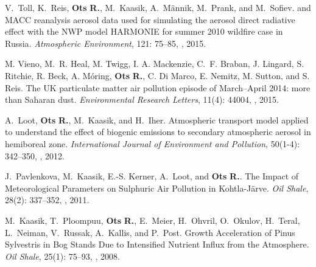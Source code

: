 \documentclass[paper=a4,fontsize=11pt]{scrartcl} %
\begin{document}
\begin{thebibliography}{3}
V.~Toll, K.~Reis, \textbf{Ots} \textbf{R.},  M.~Kaasik, A.~Männik, M.~Prank,
and M.~Sofiev.
 and {MACC} reanalysis aerosol data used for simulating the
aerosol direct radiative effect with the {NWP} model {HARMONIE} for summer
2010 wildfire case in {Russia}.
\newblock \emph{Atmospheric Environment}, 121: 75--85,
\newblock {},  2015.



M. Vieno, M.~R. Heal, M. Twigg, I. A. Mackenzie, C.~F. Braban, J. Lingard, S. Ritchie, R. Beck, A. Móring, \textbf{Ots} \textbf{R.},  C. Di Marco, E. Nemitz, M. Sutton, and S. Reis.
\newblock The UK particulate matter air pollution episode of March–April 2014: more than Saharan dust.
\newblock \emph{Environmental Research Letters}, 11(4): 44004, , 2015.

A.~Loot, \textbf{Ots} \textbf{R.},  M.~Kaasik, and H.~Iher.
\newblock Atmospheric transport model applied to understand the effect of
biogenic emissions to secondary atmospheric aerosol in hemiboreal zone.
\newblock \emph{International Journal of Environment and Pollution},
50(1-4): 342--350, 
\newblock {}, 2012.

J.~Pavlenkova, M.~Kaasik, E.-S. Kerner, A.~Loot, and \textbf{Ots} \textbf{R.}.
\newblock The {Impact} of {Meteorological} {Parameters} on {Sulphuric} {Air}
  {Pollution} in {Kohtla}-{Järve}.
\newblock \emph{Oil Shale}, 28(2): 337--352,
\newblock {} , 2011.

M.~Kaasik, T.~Ploompuu, \textbf{Ots} \textbf{R.}, E.~Meier, H.~Ohvril,
  O.~Okulov, H.~Teral, L.~Neiman, V.~Russak, A.~Kallis, and P.~Post.
\newblock Growth {Acceleration} of {Pinus} {Sylvestris} in {Bog} {Stands} {Due}
  to {Intensified} {Nutrient} {Influx} from the {Atmosphere}.
\newblock \emph{Oil Shale}, 25(1): 75--93,
\newblock {}, 2008.

\end{thebibliography}



\renewcommand{\refname}{CONFERENCE PROCEEDINGS} 
%
%
\end{document}
